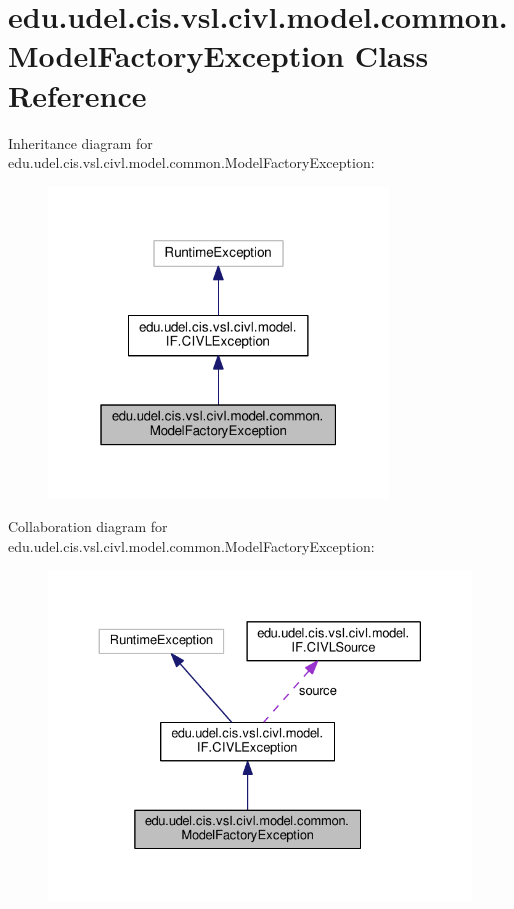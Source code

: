 \hypertarget{classedu_1_1udel_1_1cis_1_1vsl_1_1civl_1_1model_1_1common_1_1ModelFactoryException}{}\section{edu.\+udel.\+cis.\+vsl.\+civl.\+model.\+common.\+Model\+Factory\+Exception Class Reference}
\label{classedu_1_1udel_1_1cis_1_1vsl_1_1civl_1_1model_1_1common_1_1ModelFactoryException}


Inheritance diagram for edu.\+udel.\+cis.\+vsl.\+civl.\+model.\+common.\+Model\+Factory\+Exception\+:
\nopagebreak
\begin{figure}[H]
\begin{center}
\leavevmode
\includegraphics[width=256pt]{classedu_1_1udel_1_1cis_1_1vsl_1_1civl_1_1model_1_1common_1_1ModelFactoryException__inherit__graph}
\end{center}
\end{figure}


Collaboration diagram for edu.\+udel.\+cis.\+vsl.\+civl.\+model.\+common.\+Model\+Factory\+Exception\+:
\nopagebreak
\begin{figure}[H]
\begin{center}
\leavevmode
\includegraphics[width=330pt]{classedu_1_1udel_1_1cis_1_1vsl_1_1civl_1_1model_1_1common_1_1ModelFactoryException__coll__graph}
\end{center}
\end{figure}
